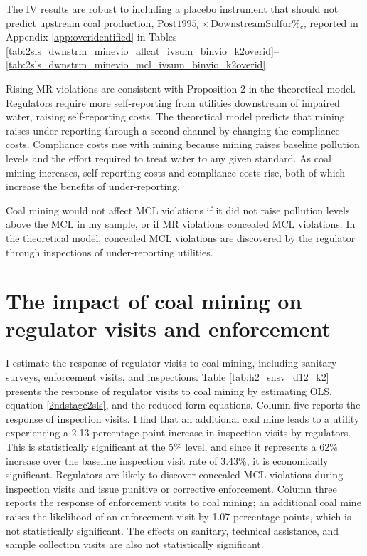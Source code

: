 \documentclass[12pt]{article}
\begin{document}
The IV results are robust to including a placebo instrument that should not predict upstream coal production, $\text{Post1995}_t \times \text{DownstreamSulfur\%}_c$, reported in Appendix \ref{app:overidentified} in Tables \ref{tab:2sls_dwnstrm_minevio_allcat_ivsum_binvio_k2overid}--\ref{tab:2sls_dwnstrm_minevio_mcl_ivsum_binvio_k2overid}.

Rising MR violations are consistent with Proposition 2 in the theoretical model. Regulators require more self-reporting from utilities downstream of impaired water, raising self-reporting costs. The theoretical model predicts that mining raises under-reporting through a second channel by changing the compliance costs. Compliance costs rise with mining because mining raises baseline pollution levels and the effort required to treat water to any given standard. As coal mining increases, self-reporting costs and compliance costs rise, both of which increase the benefits of under-reporting. 


Coal mining would not affect MCL violations if it did not raise pollution levels above the MCL in my sample, or if MR violations concealed MCL violations. In the theoretical model, concealed MCL violations are discovered by the regulator through inspections of under-reporting utilities. 

\section{The impact of coal mining on regulator visits and enforcement}\label{sec:enforcement}

I estimate the response of regulator visits to coal mining, including sanitary surveys, enforcement visits, and inspections. Table \ref{tab:h2_snsv_d12_k2} presents the response of regulator visits to coal mining by estimating OLS, equation \ref{2ndstage2sls}, and the reduced form equations. Column five reports the response of inspection visits. I find that an additional coal mine leads to a utility experiencing a 2.13 percentage point increase in inspection visits by regulators. This is statistically significant at the 5\% level, and since it represents a 62\% increase over the baseline inspection visit rate of 3.43\%, it is economically significant. Regulators are likely to discover concealed MCL violations during inspection visits and issue punitive or corrective enforcement. Column three reports the response of enforcement visits to coal mining; an additional coal mine raises the likelihood of an enforcement visit by 1.07 percentage points, which is not statistically significant. The effects on sanitary, technical assistance, and sample collection visits are also not statistically significant.
\end{document}
